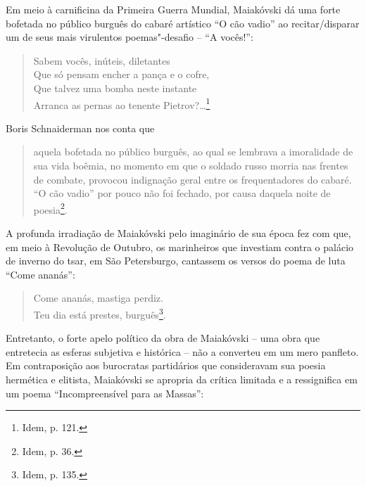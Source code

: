 Em meio à carnificina da Primeira Guerra Mundial, Maiakóvski dá uma
forte bofetada no público burguês do cabaré artístico ``O cão vadio'' ao
recitar/disparar um de seus mais virulentos poemas"-desafio -- ``A
vocês!'':

\begin{verse}
Sabem vocês, inúteis, diletantes\\
Que só pensam encher a pança e o cofre,\\
Que talvez uma bomba neste instante\\
Arranca as pernas ao tenente Pietrov?\ldots{}\footnote{Idem, p. 121.}
\end{verse}

Boris Schnaiderman nos conta que

\begin{quote}
aquela bofetada no público burguês, ao qual se lembrava a imoralidade de
sua vida boêmia, no momento em que o soldado russo morria nas frentes de
combate, provocou indignação geral entre os frequentadores do cabaré.
``O cão vadio'' por pouco não foi fechado, por causa daquela noite de
poesia\footnote{Idem, p. 36.}.
\end{quote}

A profunda irradiação de Maiakóvski pelo imaginário de sua época fez com
que, em meio à Revolução de Outubro, os marinheiros que investiam contra
o palácio de inverno do tsar, em São Petersburgo, cantassem os versos do
poema de luta ``Come ananás'':

\begin{verse}
Come ananás, mastiga perdiz.\\
Teu dia está prestes, burguês\footnote{Idem, p. 135.}.
\end{verse}

Entretanto, o forte apelo político da obra de Maiakóvski -- uma obra que
entretecia as esferas subjetiva e histórica -- não a converteu em um
mero panfleto. Em contraposição aos burocratas partidários que
consideravam sua poesia hermética e elitista, Maiakóvski se apropria da
crítica limitada e a ressignifica em um poema ``Incompreensível para as
Massas'':

